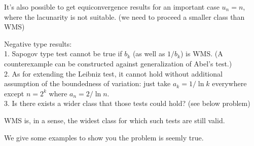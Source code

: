 \newline\newline
{}
\newline\newline
It's also possible to get equiconvergence results for an important case $u_n = n$, where the lacunarity is not suitable. (we need to proceed a smaller class than WMS)\\
\begin{nt*}
    Negative type results: \\
    1. Sapogov type test cannot be true if ${b_k}$ (as well as ${1/b_k}$) is WMS. (A counterexample can be constructed against generalization of Abel's test.) \\
    2. As for extending the Leibniz test, it cannot hold without additional assumption of the boundedness of variation: just take $a_k = 1/\ln k$ everywhere except $n = 2^k$ where $a_n = 2/\ln n$. \\
    3. Is there exists a wider class that those tests could hold? (see below problem)
\end{nt*}
\begin{prb*}
    WMS is, in a sense, the widest class for which such tests are still valid.
\end{prb*}
We give some examples to show you the problem is seemly true. 
